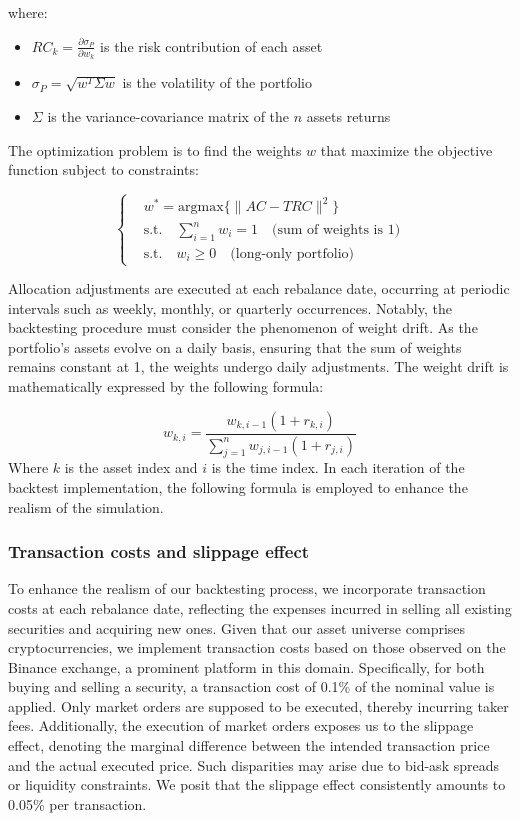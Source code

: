 \documentclass{article}
\begin{document}
where:
\begin{itemize}
    \item $RC_k = \frac{\partial \sigma_P}{\partial w_k}$ is the risk contribution of each asset
    \item $\sigma_P=\sqrt{w^T \Sigma w}$ is the volatility of the portfolio
    \item $\Sigma$ is the variance-covariance matrix of the $n$ assets returns
\end{itemize}

The optimization problem is to find the weights $w$ that maximize the objective function subject to constraints:

\[
\begin{cases}
\text{} & w^*=\text{argmax}\{\lVert AC - TRC \rVert^2\} \\
\text{} & \text{s.t.}\quad \sum_{i=1}^{n} w_i = 1 \quad \text{(sum of weights is 1)} \\
\text{} & \text{s.t.}\quad w_i \geq 0 \quad \text{(long-only portfolio)}
\end{cases}
\]

Allocation adjustments are executed at each rebalance date, occurring at periodic intervals such as weekly, monthly, or quarterly occurrences. Notably, the backtesting procedure must consider the phenomenon of weight drift. As the portfolio's assets evolve on a daily basis, ensuring that the sum of weights remains constant at 1, the weights undergo daily adjustments. The weight drift is mathematically expressed by the following formula:
 
$$w_{k,i}=\frac{w_{k,i-1} (1+r_{k,i})}{\sum_{j=1}^n w_{j,i-1}(1+r_{j,i})}$$
Where $k$ is the asset index and $i$ is the time index.\newline
In each iteration of the backtest implementation, the following formula is employed to enhance the realism of the simulation.
\subsubsection{Transaction costs and slippage effect}
To enhance the realism of our backtesting process, we incorporate transaction costs at each rebalance date, reflecting the expenses incurred in selling all existing securities and acquiring new ones. Given that our asset universe comprises cryptocurrencies, we implement transaction costs based on those observed on the Binance exchange, a prominent platform in this domain. Specifically, for both buying and selling a security, a transaction cost of 0.1\% of the nominal value is applied. Only market orders are supposed to be executed, thereby incurring taker fees.\newline\newline
Additionally, the execution of market orders exposes us to the slippage effect, denoting the marginal difference between the intended transaction price and the actual executed price. Such disparities may arise due to bid-ask spreads or liquidity constraints. We posit that the slippage effect consistently amounts to 0.05\% per transaction.
\end{document}
